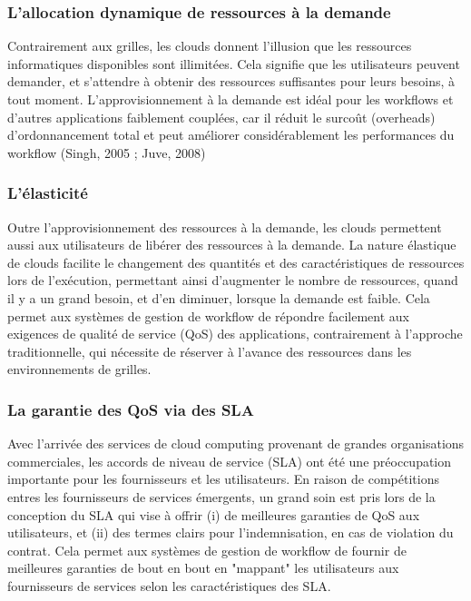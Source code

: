 \subsubsection{L’allocation dynamique de ressources à la demande }
Contrairement aux grilles, les clouds donnent l'illusion que les ressources informatiques disponibles sont illimitées. Cela signifie que les utilisateurs peuvent demander, et s’attendre à obtenir des ressources suffisantes pour leurs besoins, à tout moment. L’approvisionnement à la demande est idéal pour les workflows et d'autres applications faiblement couplées, car il réduit le surcoût (overheads) d’ordonnancement total et peut améliorer considérablement les performances du workflow (Singh, 2005 ; Juve, 2008) 
\subsubsection{L’élasticité}
Outre l’approvisionnement des ressources à la demande, les clouds permettent aussi aux utilisateurs de libérer des ressources à la demande. La nature élastique de clouds facilite le changement des quantités et des caractéristiques de ressources lors de l'exécution, permettant ainsi d’augmenter le nombre de ressources, quand il y a un grand besoin, et d’en diminuer, lorsque la demande est faible. Cela permet aux systèmes de gestion de workflow de répondre facilement aux exigences de qualité de service (QoS) des applications, contrairement à l'approche traditionnelle, qui nécessite de réserver à l'avance des ressources dans les environnements de grilles. 
\subsubsection{La garantie des QoS via des SLA }
Avec l’arrivée des services de cloud computing  provenant de grandes organisations commerciales, les accords de niveau de service (SLA) ont été une préoccupation importante pour les fournisseurs et les utilisateurs. En raison de compétitions entres les fournisseurs de services émergents, un grand soin est pris lors de la conception du SLA qui vise à offrir (i) de meilleures garanties de QoS aux utilisateurs, et (ii) des termes clairs pour l'indemnisation, en cas de violation du contrat. Cela permet aux systèmes de gestion de workflow de fournir de meilleures garanties de bout en bout en "mappant" les utilisateurs aux fournisseurs de services selon les caractéristiques des SLA.

